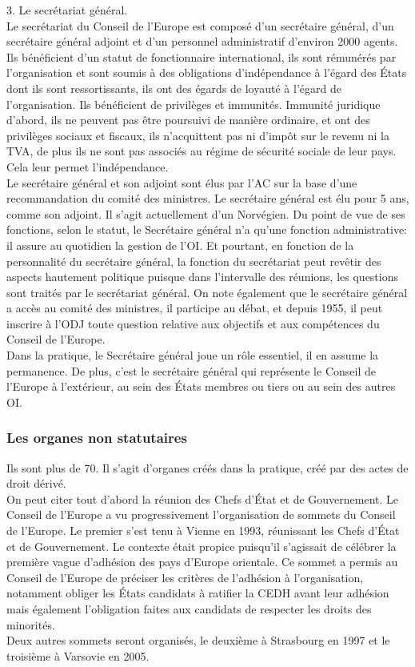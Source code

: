 \documentclass[10pt, a4paper, openany]{book}
\begin{document}
3. Le secrétariat général. \\
Le secrétariat du Conseil de l'Europe est composé d'un secrétaire général, d'un secrétaire général adjoint et d'un personnel administratif d'environ 2000 agents. Ils bénéficient d'un statut de fonctionnaire international, ils sont rémunérés par l'organisation et sont soumis à des obligations d'indépendance à l'égard des États dont ils sont ressortissants, ils ont des égards de loyauté à l'égard de l'organisation. Ils bénéficient de privilèges et immunités. Immunité juridique d'abord, ils ne peuvent pas être poursuivi de manière ordinaire, et ont des privilèges sociaux et fiscaux, ils n'acquittent pas ni d'impôt sur le revenu ni la TVA, de plus ils ne sont pas associés au régime de sécurité sociale de leur pays. Cela leur permet l'indépendance. \\
Le secrétaire général et son adjoint sont élus par l'AC sur la base d'une recommandation du comité des ministres. Le secrétaire général est élu pour 5 ans, comme son adjoint. Il s'agit actuellement d'un Norvégien. Du point de vue de ses fonctions, selon le statut, le Secrétaire général n'a qu'une fonction administrative: il assure au quotidien la gestion de l'OI. Et pourtant, en fonction de la personnalité du secrétaire général, la fonction du secrétariat peut revêtir des aspects hautement politique puisque dans l'intervalle des réunions, les questions sont traités par le secrétariat général. On note également que le secrétaire général a accès au comité des ministres, il participe au débat, et depuis 1955, il peut inscrire à l'ODJ toute question relative aux objectifs et aux compétences du Conseil de l'Europe. \\
Dans la pratique, le Secrétaire général joue un rôle essentiel, il en assume la permanence. De plus, c'est le secrétaire général qui représente le Conseil de l'Europe à l'extérieur, au sein des États membres ou tiers ou au sein des autres OI. 

\subsubsection{Les organes non statutaires}

Ils sont plus de 70. Il s'agit d'organes créés dans la pratique, créé par des actes de droit dérivé. \\
On peut citer tout d'abord la réunion des Chefs d'État et de Gouvernement. Le Conseil de l'Europe a vu progressivement l'organisation de sommets du Conseil de l'Europe. Le premier s'est tenu à Vienne en 1993, réunissant les Chefs d'État et de Gouvernement. Le contexte était propice puisqu'il s'agissait de célébrer la première vague d'adhésion des pays d'Europe orientale. Ce sommet a permis au Conseil de l'Europe de préciser les critères de l'adhésion à l'organisation, notamment obliger les États candidats à ratifier la CEDH avant leur adhésion mais également l'obligation faites aux candidats de respecter les droits des minorités. \\
Deux autres sommets seront organisés, le deuxième à Strasbourg en 1997 et le troisième à Varsovie en 2005. 
\end{document}
